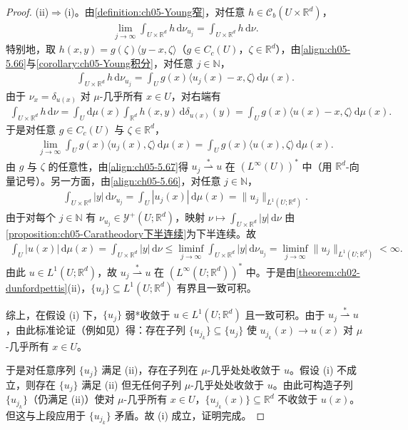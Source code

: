 \documentclass[../../main.tex]{subfiles}%
\begin{document}
\begin{proof}
(ii)$\Rightarrow$(i)。由\cref{definition:ch05-Young窄}，对任意 $h\in\mathcal{C}_b(U\times\mathbb{R}^d)$，
\begin{align*}
\lim_{j\to\infty}\int_{U\times\mathbb{R}^d}h\,\mathrm{d}\nu_{u_j}
=\int_{U\times\mathbb{R}^d}h\,\mathrm{d}\nu.
\end{align*}
特别地，取 $h(x,y)=g(\zeta)\langle y-x,\zeta\rangle$（$g\in C_c(U)$，$\zeta\in\mathbb{R}^d$），由\eqref{align:ch05-5.66}与\cref{corollary:ch05-Young积分}，对任意 $j\in\mathbb{N}$，
\begin{align*}
\int_{U\times\mathbb{R}^d}h\,\mathrm{d}\nu_{u_j}
=\int_U g(x)\langle u_j(x)-x,\zeta\rangle\,\mathrm{d}\mu(x).
\end{align*}
由于 $\nu_x=\delta_{u(x)}$ 对 $\mu$-几乎所有 $x\in U$，对右端有
\begin{align*}
\int_{U\times\mathbb{R}^d}h\,\mathrm{d}\nu
=\int_U\mathrm{d}\mu(x)\int_{\mathbb{R}^d}h(x,y)\,\mathrm{d}\delta_{u(x)}(y)
=\int_U g(x)\langle u(x)-x,\zeta\rangle\,\mathrm{d}\mu(x).
\end{align*}
于是对任意 $g\in C_c(U)$ 与 $\zeta\in\mathbb{R}^d$，
\begin{align}
\lim_{j\to\infty}\int_U g(x)\langle u_j(x),\zeta\rangle\,\mathrm{d}\mu(x)
=\int_U g(x)\langle u(x),\zeta\rangle\,\mathrm{d}\mu(x).\label{align:ch05-5.67}
\end{align}
由 $g$ 与 $\zeta$ 的任意性，由\eqref{align:ch05-5.67}得 $u_j\stackrel{*}{\rightharpoonup}u$ 在 $(L^\infty(U))^*$ 中（用 $\mathbb{R}^d$-向量记号）。另一方面，由\eqref{align:ch05-5.66}，对任意 $j\in\mathbb{N}$，
\begin{align*}
\int_{U\times\mathbb{R}^d}|y|\,\mathrm{d}\nu_{u_j}
=\int_U|u_j(x)|\,\mathrm{d}\mu(x)
=\|u_j\|_{L^1(U;\mathbb{R}^d)}.
\end{align*}
由于对每个 $j\in\mathbb{N}$ 有 $\nu_{u_j}\in\mathcal{Y}^+(U;\mathbb{R}^d)$，映射 $\nu\mapsto\int_{U\times\mathbb{R}^d}|y|\,\mathrm{d}\nu$ 由\cref{proposition:ch05-Caratheodory下半连续}为下半连续。故
\begin{align*}
\int_U|u(x)|\,\mathrm{d}\mu(x)
=\int_{U\times\mathbb{R}^d}|y|\,\mathrm{d}\nu
\leqslant\liminf_{j\to\infty}\int_{U\times\mathbb{R}^d}|y|\,\mathrm{d}\nu_{u_j}
=\liminf_{j\to\infty}\|u_j\|_{L^1(U;\mathbb{R}^d)}<\infty.
\end{align*}
由此 $u\in L^1(U;\mathbb{R}^d)$，故 $u_j\stackrel{*}{\rightharpoonup}u$ 在 $(L^\infty(U;\mathbb{R}^d))^*$ 中。于是由\cref{theorem:ch02-dunfordpettis}(ii)，$\{u_j\}\subseteq L^1(U;\mathbb{R}^d)$ 有界且一致可积。

综上，在假设 (i) 下，$\{u_j\}$ 弱*收敛于 $u\in L^1(U;\mathbb{R}^d)$ 且一致可积。由于 $u_j\stackrel{*}{\rightharpoonup}u$，由此标准论证（例如见\cite[Theorem 3.10 and Corollary 3.11]{ref14}）得：存在子列 $\{u_{j_k}\}\subseteq\{u_j\}$ 使 $u_{j_k}(x)\to u(x)$ 对 $\mu$-几乎所有 $x\in U$。

于是对任意序列 $\{u_j\}$ 满足 (ii)，存在子列在 $\mu$-几乎处处收敛于 $u$。假设 (i) 不成立，则存在 $\{u_j\}$ 满足 (ii) 但无任何子列 $\mu$-几乎处处收敛于 $u$。由此可构造子列 $\{u_{j_k}\}$（仍满足 (ii)）使对 $\mu$-几乎所有 $x\in U$，$\{u_{j_k}(x)\}\subseteq\mathbb{R}^d$ 不收敛于 $u(x)$。但这与上段应用于 $\{u_{j_k}\}$ 矛盾。故 (i) 成立，证明完成。
\end{proof}
\end{document}

